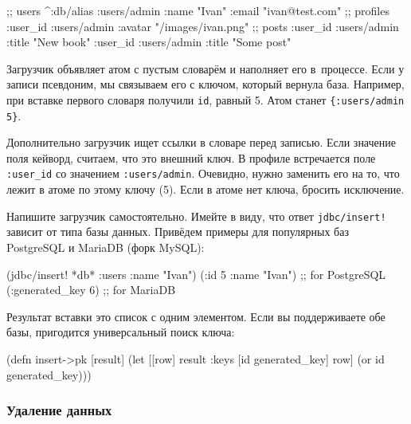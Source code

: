 
\begin{english}
  \begin{clojure}
;; users
^{:db/alias :users/admin}
 {:name "Ivan" :email "ivan@test.com"}
;; profiles
{:user_id :users/admin :avatar "/images/ivan.png"}
;; posts
{:user_id :users/admin :title "New book"}
{:user_id :users/admin :title "Some post"}
  \end{clojure}
\end{english}

Загрузчик объявляет атом с пустым словарём и наполняет его в~процессе. Если у
записи псевдоним, мы связываем его с ключом, который вернула база. Например, при
вставке первого словаря получили \verb|id|, равный 5. Атом станет
\verb|{:users/admin 5}|.

Дополнительно загрузчик ищет ссылки в словаре перед записью. Если значение
поля кейворд, считаем, что это внешний ключ. В профиле встречается поле
\verb|:user_id| со значением \verb|:users/admin|. Очевидно, нужно заменить
его на то, что лежит в атоме по этому ключу (5). Если в атоме нет ключа,
бросить исключение.


Напишите загрузчик самостоятельно. Имейте в виду, что ответ
\verb|jdbc/insert!| зависит от типа базы данных. Привёдем примеры для
популярных баз PostgreSQL и MariaDB (форк MySQL):

\begin{english}
  \begin{clojure}
(jdbc/insert! *db* :users {:name "Ivan"})
({:id 5 :name "Ivan"}) ;; for PostgreSQL
({:generated_key 6})   ;; for MariaDB
  \end{clojure}
\end{english}

Результат вставки это список с одним элементом. Если вы поддерживаете обе базы,
пригодится универсальный поиск ключа:

\begin{english}
  \begin{clojure}
(defn insert->pk [result]
  (let [[row] result
        {:keys [id generated_key]} row]
    (or id generated_key)))
  \end{clojure}
\end{english}

\subsubsection*{Удаление данных}

